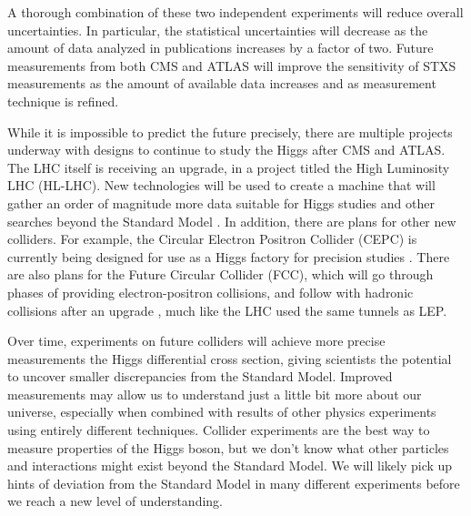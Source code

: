 A thorough combination of these two independent experiments will reduce overall uncertainties.
In particular, the statistical uncertainties will decrease as the amount of data analyzed in publications
increases by a factor of two.
Future measurements from both CMS and ATLAS will improve the sensitivity of STXS measurements
as the amount of available data increases and as measurement technique is refined.

While it is impossible to predict the future precisely,
there are multiple projects underway with designs to continue to study the Higgs after CMS and ATLAS.
The LHC itself is receiving an upgrade, in a project titled the High Luminosity LHC (HL-LHC).
New technologies will be used to create a machine that will gather
an order of magnitude more data suitable for Higgs studies and
other searches beyond the Standard Model \cite{osti_1365580}.
In addition, there are plans for other new colliders.
For example, the Circular Electron Positron Collider (CEPC) is currently being designed
for use as a Higgs factory for precision studies \cite{thecepcstudygroup2018cepc}.
There are also plans for the Future Circular Collider (FCC),
which will go through phases of providing electron-positron collisions,
and follow with hadronic collisions after an upgrade \cite{benedikt2020future},
much like the LHC used the same tunnels as LEP.

Over time, experiments on future colliders will achieve more precise measurements
the Higgs differential cross section,
giving scientists the potential to uncover smaller discrepancies from the Standard Model.
Improved measurements may allow us to understand just a little bit more about our universe,
especially when combined with results of other physics experiments using entirely different techniques.
Collider experiments are the best way to measure properties of the Higgs boson,
but we don't know what other particles and interactions might exist beyond the Standard Model.
We will likely pick up hints of deviation from the Standard Model in many different experiments
before we reach a new level of understanding.
